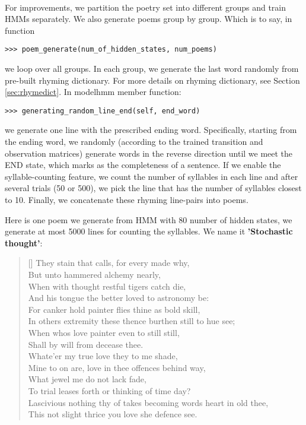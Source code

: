 \paragraph{}
For improvements, we partition the poetry set into different groups and train HMMs separately. We also generate poems group by group. Which is to say, in function
\begin{lstlisting}
>>> poem_generate(num_of_hidden_states, num_poems)
\end{lstlisting}
we loop over all groups. In each group, we generate the last word randomly from pre-built rhyming dictionary. For more details on rhyming dictionary, see Section \ref{sec:rhymedict}. In modelhmm member function:
\begin{lstlisting}
>>> generating_random_line_end(self, end_word)
\end{lstlisting}
we generate one line with the prescribed ending word. Specifically, starting from the ending word, we randomly (according to the trained transition and observation matrices) generate words in the reverse direction until we meet the END state, which marks as the completeness of a sentence. If we enable the syllable-counting feature, we count the number of syllables in each line and after several trials (50 or 500), we pick the line that has the number of syllables closest to 10. Finally, we concatenate these rhyming line-pairs into poems.

Here is one poem we generate from HMM with 80 number of hidden states, we generate at most 5000 lines for counting the syllables. We name it \textbf{'Stochastic thought'}:
\renewcommand{\poemtoc}{subsection}
\settowidth{\versewidth}{Thy proud hearts slave and vassal wretch to be?}
\begin{verse}[\versewidth]
They stain that calls, for every made why,\\
But unto hammered alchemy nearly,\\
When with thought restful tigers catch die,\\
And his tongue the better loved to astronomy be:\\
\vspace{5pt}
For canker hold painter flies thine as bold skill,\\
In others extremity these thence burthen still to hue see;\\
When whos love painter even to still still,\\
Shall by will from decease thee.\\
\vspace{5pt}
Whate'er my true love they to me shade,\\
Mine to on are, love in thee offences behind way,\\
What jewel me do not lack fade,\\
To trial leases forth or thinking of time day?\\
\vspace{5pt}
\vin  Lascivious nothing thy of takes becoming words heart in old thee,\\
\vin  This not slight thrice you love she defence see.\\
\end{verse}

